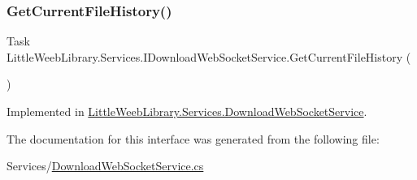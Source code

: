 \subsubsection{\texorpdfstring{Get\+Current\+File\+History()}{GetCurrentFileHistory()}}
{\footnotesize\ttfamily Task Little\+Weeb\+Library.\+Services.\+I\+Download\+Web\+Socket\+Service.\+Get\+Current\+File\+History (\begin{DoxyParamCaption}{ }\end{DoxyParamCaption})}



Implemented in \mbox{\hyperlink{class_little_weeb_library_1_1_services_1_1_download_web_socket_service_adb3b1a3aadf9ad491388890e432f6c91}{Little\+Weeb\+Library.\+Services.\+Download\+Web\+Socket\+Service}}.



The documentation for this interface was generated from the following file\+:\begin{DoxyCompactItemize}
\item 
Services/\mbox{\hyperlink{_download_web_socket_service_8cs}{Download\+Web\+Socket\+Service.\+cs}}\end{DoxyCompactItemize}
